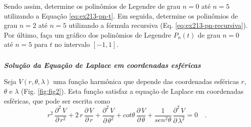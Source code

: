 \documentclass[10pt,a4paper,fleqn]{article}
\begin{document}
\begin{flushleft}
\dotfill
\end{flushleft}

Sendo assim, determine os polin\^{o}mios de Legendre de grau $n = 0$ at\'{e} $n = 5$ utilizando a Equação \ref{eq:ex213-pn-t}. 
Em seguida, determine os polin\^{o}mios de grau $n = 2$ at\'{e} $n = 5$ utilizando a f\'{o}rmula recursiva 
(Eq. \ref{eq:ex213-pn-recursiva}). Por \'{u}ltimo, faça um gr\'{a}fico dos polin\^{o}mios de Legendre $P_{n}(t)$ de grau $n = 0$ 
at\'{e} $n = 5$ para $t$ no intervalo $[-1,1]$.

\begin{flushleft}
\dotfill
\end{flushleft}

\subsubsection{}

\begin{flushleft}
\emph{\textbf{Soluç\~{a}o da Equaç\~{a}o de Laplace em coordenadas esf\'{e}ricas}}
\end{flushleft}

\bigskip
\bigskip

Seja $V(r,\theta,\lambda)$ uma funç\~{a}o harm\^{o}nica que depende das coordenadas esf\'{e}ricas $r$, $\theta$ e $\lambda$ 
(Fig. \ref{fig:fig2}). Esta funç\~{a}o satisfaz a equaç\~{a}o de Laplace em coordenadas esf\'{e}ricas, que pode ser escrita como
\begin{equation}
r^{2} \, \frac{\partial^{2} \, V}{\partial \, r^{2}} +
2 \, r \, \frac{\partial \, V}{\partial \, r} +
\frac{\partial^{2} \, V}{\partial \, \theta^{2}} +
cot \theta \, \frac{\partial \, V}{\partial \, \theta} +
\frac{1}{sen^{2} \theta} \, \frac{\partial^{2} \, V}{\partial \, \lambda^{2}} = 0 \quad .
\label{eq:ex214-eq-Laplace-esferica}
\end{equation}
\end{document}
